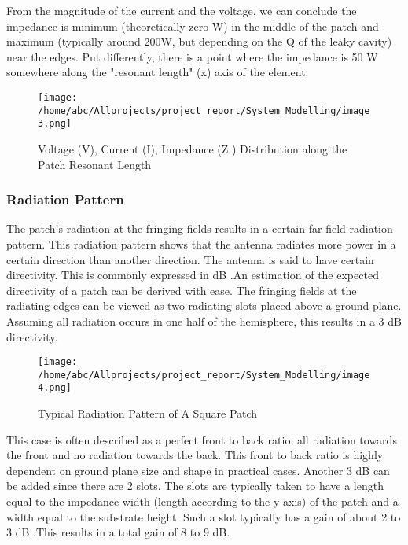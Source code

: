\documentclass[12pt]{article}
\begin{document}
	 \justify
      From the magnitude of the current and the voltage, we can conclude the impedance is minimum (theoretically zero W) in the middle of the patch and maximum (typically around 200W, but depending on the Q of the leaky cavity) near the edges. Put differently, there is a point where the impedance is 50 W somewhere along the "resonant length" (x) axis of the element.

        \begin{figure}[H]
         	\centering
           	\texttt{[image: /home/abc/Allprojects/project\_report/System\_Modelling/image3.png]}
           	\caption{Voltage (V), Current (I), Impedance (Z ) Distribution along the Patch Resonant Length}
         \end{figure}



      \subsubsection{Radiation Pattern}
       \justify
        The patch's radiation at the fringing fields results in a certain far field radiation pattern. This radiation pattern shows that the antenna radiates more power in a certain direction than another direction. The antenna is said to have certain directivity. This is commonly expressed in dB .An estimation of the expected directivity of a patch can be derived with ease. The fringing fields at the radiating edges can be viewed as two radiating slots placed above a ground plane. Assuming all radiation occurs in one half of the hemisphere, this results in a 3 dB directivity.


        \begin{figure}[H]
        	\centering
        	\texttt{[image: /home/abc/Allprojects/project\_report/System\_Modelling/image4.png]}
        	\caption{Typical Radiation Pattern of A Square Patch}
        \end{figure}

        This case is often described as a perfect front to back ratio; all radiation towards the front and no radiation towards the back. This front to back ratio is highly dependent on ground plane size and shape in practical cases. Another 3 dB can be added since there are 2 slots. The slots are typically taken to have a length equal to the impedance width (length according to the y axis) of the patch and a width equal to the substrate height. Such a slot typically has a gain of about 2 to 3 dB .This results in a total gain of 8 to 9 dB.
\end{document}
